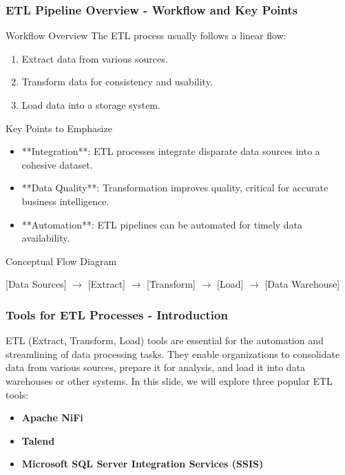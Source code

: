 \documentclass{beamer}
\begin{document}
\begin{frame}[fragile]
    \frametitle{ETL Pipeline Overview - Workflow and Key Points}
    \begin{block}{Workflow Overview}
        The ETL process usually follows a linear flow:
        \begin{enumerate}
            \item Extract data from various sources.
            \item Transform data for consistency and usability.
            \item Load data into a storage system.
        \end{enumerate}
    \end{block}

    \begin{block}{Key Points to Emphasize}
        \begin{itemize}
            \item **Integration**: ETL processes integrate disparate data sources into a cohesive dataset.
            \item **Data Quality**: Transformation improves quality, critical for accurate business intelligence.
            \item **Automation**: ETL pipelines can be automated for timely data availability.
        \end{itemize}
    \end{block}

    \begin{block}{Conceptual Flow Diagram}
        \begin{center}
        [Data Sources] $\rightarrow$ [Extract] $\rightarrow$ [Transform] $\rightarrow$ [Load] $\rightarrow$ [Data Warehouse]
        \end{center}
    \end{block}
\end{frame}

\begin{frame}[fragile]
    \frametitle{Tools for ETL Processes - Introduction}
    ETL (Extract, Transform, Load) tools are essential for the automation and streamlining of data processing tasks. They enable organizations to consolidate data from various sources, prepare it for analysis, and load it into data warehouses or other systems. 
    In this slide, we will explore three popular ETL tools:
    \begin{itemize}
        \item \textbf{Apache NiFi}
        \item \textbf{Talend}
        \item \textbf{Microsoft SQL Server Integration Services (SSIS)}
    \end{itemize}
\end{frame}
\end{document}
